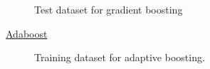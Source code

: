\documentclass[12pt]{article} %
\begin{document}
\begin{figure}[H]
	\vspace{-10mm}
	\caption{Test dataset for gradient boosting}
\end{figure}



\underline{Adaboost}
\begin{figure}[H]
	\vspace{-10mm}
	\caption{Training dataset for adaptive boosting.}
\end{figure}
\end{document}

